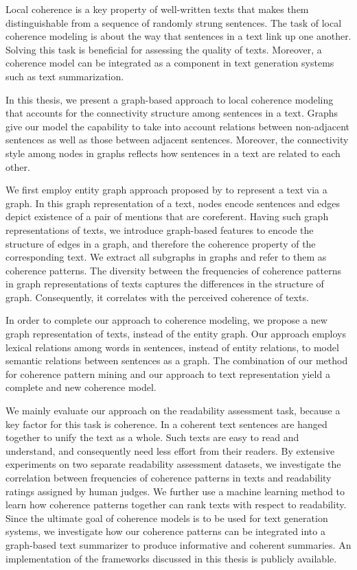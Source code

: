 
\addchap*{\abstractname}

Local coherence is a key property of well-written texts that makes them distinguishable from a sequence of randomly strung sentences. 
The task of local coherence modeling is about the way that sentences in a text link up one another.  
Solving this task is beneficial for assessing the quality of texts. 
Moreover, a coherence model can be integrated as a component in text generation systems such as text summarization. 

In this thesis, we present a graph-based approach to local coherence modeling that accounts for the connectivity structure among sentences in a text. 
Graphs give our model the capability to take into account relations between non-adjacent sentences as well as those between adjacent sentences. 
Moreover, the connectivity style among nodes in graphs reflects how sentences in a text are related to each other. 

We first employ entity graph approach proposed by  to represent a text via a graph. 
In this graph representation of a text, nodes encode sentences and edges depict existence of a pair of mentions that are coreferent.   
Having such graph representations of texts, we introduce graph-based features to encode the structure of edges in a graph, and therefore the coherence property of the corresponding text.   
We extract all subgraphs in graphs and refer to them as coherence patterns. 
The diversity between the frequencies of coherence patterns in graph representations of texts captures the differences in the structure of graph.  
Consequently, it correlates with the perceived coherence of texts.  

In order to complete our approach to coherence modeling, we propose a new graph representation of texts, instead of the entity graph.  
Our approach employs lexical relations among words in sentences, instead of entity relations, to model semantic relations between sentences as a graph. 
The combination of our method for coherence pattern mining and our approach to text representation yield a complete and new coherence model. 

We mainly evaluate our approach on the readability assessment task, because a key factor for this task is coherence. 
In a coherent text sentences are hanged together to unify the text as a whole. 
Such texts are easy to read and understand, and consequently need less effort from their readers. 
By extensive experiments on two separate readability assessment datasets, 
we investigate the correlation between frequencies of coherence patterns in texts and readability ratings assigned by human judges.    
We further use a machine learning method to learn how coherence patterns together can rank texts with respect to readability. 
Since the ultimate goal of coherence models is to be used for text generation systems, we investigate how our coherence patterns can be integrated into a graph-based text summarizer to produce informative and coherent summaries. 
An implementation of the frameworks discussed in this thesis is publicly available.


